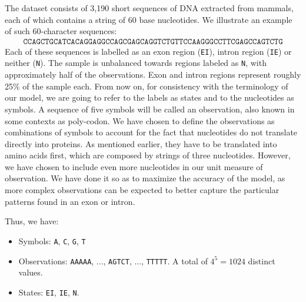 \documentclass[a4paper, 11pt]{article} %
\begin{document}
The dataset consists of 3,190 short sequences of DNA extracted from mammals, each of which contains a string of 60 base nucleotides. We illustrate an example of such 60-character sequences:
\begin{eqnarray}
\texttt{CCAGCTGCATCACAGGAGGCCAGCGAGCAGGTCTGTTCCAAGGGCCTTCGAGCCAGTCTG}  \nonumber
\end{eqnarray}
Each of these sequences is labelled as an exon region (\texttt{EI}), intron region (\texttt{IE}) or neither (\texttt{N}). The sample is unbalanced towards regions labeled as \texttt{N}, with approximately half of the observations. Exon and intron regions represent roughly 25\% of the sample each. From now on, for consistency with the terminology of our model, we are going to refer to the labels as states and to the nucleotides as symbols. A sequence of five symbols will be called an observation, also known in some contexts as poly-codon. We have chosen to define the observations as combinations of symbols to account for the fact that nucleotides do not translate directly into proteins. As mentioned earlier, they have to be translated into amino acids first, which are composed by strings of three nucleotides. However, we have chosen to include even more nucleotides in our unit measure of observation. We have done it so as to maximize the accuracy of the model, as more complex observations can be expected to better capture the particular patterns found in an exon or intron.

Thus, we have:
\begin{itemize}
\item Symbols: \texttt{A}, \texttt{C}, \texttt{G}, \texttt{T}
\item Observations: \texttt{AAAAA}, ..., \texttt{AGTCT}, ..., \texttt{TTTTT}. A total of $4^5=1024$ distinct values.
\item States: \texttt{EI}, \texttt{IE}, \texttt{N}.
\end{itemize}
\end{document}
